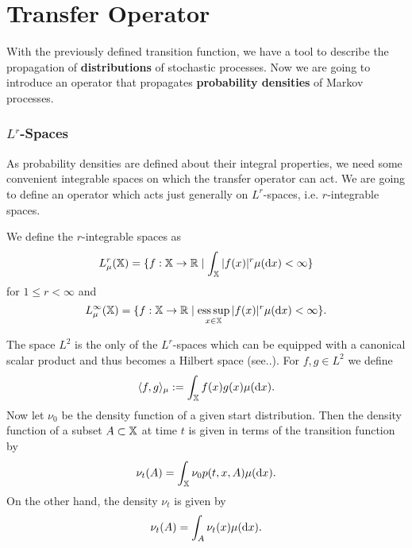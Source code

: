 \section{Transfer Operator}
\label{sec:transfer}

With the previously defined transition function, we have a tool to describe the propagation of \textbf{distributions} of stochastic processes. Now we are going to introduce an operator that propagates \textbf{probability densities} of Markov processes.

\subsubsection*{$L^r$-Spaces}

As probability densities are defined about their integral properties, 
we need some convenient integrable spaces on which the transfer operator can act.
We are going to define an operator which acts just generally on $L^r$-spaces, i.e. $r$-integrable spaces.

\begin{defi}[$L^r$-Spaces] We define the $r$-integrable spaces as
\begin{equation*}
L_\mu^r(\mathbb{X}) = \{ f: \mathbb{X} \rightarrow \mathbb{R} \mid \int_{\mathbb{X}} |f(x)|^r \mu(\mathop{}\!\mathrm{d} x) < \infty \}
\end{equation*}
for $1 \leq r < \infty$ and
\begin{equation*}
L_\mu^\infty(\mathbb{X}) = \{ f: \mathbb{X} \rightarrow \mathbb{R} \mid \operatorname*{ess\,sup}_{x\in\mathbb{X}} |f(x)|^r \mu(\mathop{}\!\mathrm{d} x) < \infty \}.
\end{equation*}
\end{defi}
The space $L^2$ is the only of the $L^r$-spaces which can be equipped with a canonical scalar product and thus becomes a Hilbert space (see..). For $f,g \in L^2$ we define 
\begin{equation*}
\langle f,g \rangle_\mu := \int_{\mathbb{X}} f(x)g(x) \mu(\mathop{}\!\mathrm{d} x).
\end{equation*}
Now let $\nu_0$ be the density function of a given start distribution.
Then the density function of a subset $A \subset \mathbb{X}$ at time $t$ is given in terms of the transition function by
\begin{equation*}
\nu_t(A) = \int_{\mathbb{X}} \nu_0 p(t,x,A) \mu(\mathop{}\!\mathrm{d} x).
\end{equation*}
On the other hand, the density $\nu_t$ is given by
\begin{equation*}
\nu_t(A) = \int_A \nu_t(x) \mu(\mathop{}\!\mathrm{d} x).
\end{equation*}

